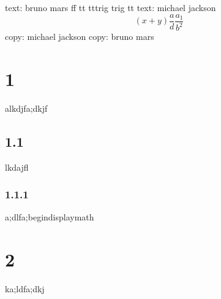 \documentclass{article}
\begin{document}
   text: bruno mars
   ff tt tttrig trig
   tt text: michael jackson
   \begin{equation}
      (x + y)
      \frac{a}{d}
      \frac{a_1}{b^2}
   \end{equation}
   copy: michael jackson
   copy: bruno mars
   \section{1}alkdjfa;dkjf
   \subsection{1.1}lkdajfl
   \subsubsection{1.1.1}a;dlfa;begin{displaymath}
   \section{2}ka;ldfa;dkj
\end{document}
